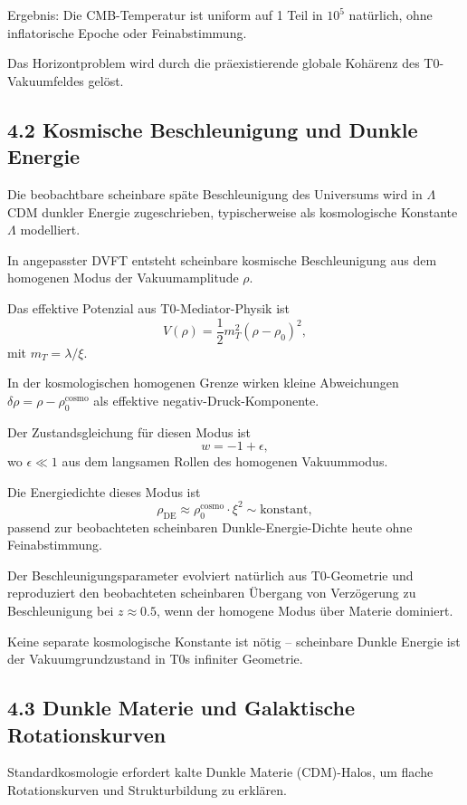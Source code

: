 	Ergebnis: Die CMB-Temperatur ist uniform auf 1 Teil in $10^5$ natürlich, ohne inflatorische Epoche oder Feinabstimmung.
	
	Das Horizontproblem wird durch die präexistierende globale Kohärenz des T0-Vakuumfeldes gelöst.
	
	\subsection{4.2 Kosmische Beschleunigung und Dunkle Energie}
	
	Die beobachtbare scheinbare späte Beschleunigung des Universums wird in $\Lambda$CDM dunkler Energie zugeschrieben, typischerweise als kosmologische Konstante $\Lambda$ modelliert.
	
	In angepasster DVFT entsteht scheinbare kosmische Beschleunigung aus dem homogenen Modus der Vakuumamplitude $\rho$.
	
	Das effektive Potenzial aus T0-Mediator-Physik ist
	\[
	V(\rho) = \frac{1}{2} m_T^2 (\rho - \rho_0)^2,
	\]
	mit $m_T = \lambda / \xi$.
	
	In der kosmologischen homogenen Grenze wirken kleine Abweichungen $\delta \rho = \rho - \rho_0^{\text{cosmo}}$ als effektive negativ-Druck-Komponente.
	
	Der Zustandsgleichung für diesen Modus ist
	\[
	w = -1 + \epsilon,
	\]
	wo $\epsilon \ll 1$ aus dem langsamen Rollen des homogenen Vakuummodus.
	
	Die Energiedichte dieses Modus ist
	\[
	\rho_{\text{DE}} \approx \rho_0^{\text{cosmo}} \cdot \xi^2 \sim \text{konstant},
	\]
	passend zur beobachteten scheinbaren Dunkle-Energie-Dichte heute ohne Feinabstimmung.
	
	Der Beschleunigungsparameter evolviert natürlich aus T0-Geometrie und reproduziert den beobachteten scheinbaren Übergang von Verzögerung zu Beschleunigung bei $z \approx 0.5$, wenn der homogene Modus über Materie dominiert.
	
	Keine separate kosmologische Konstante ist nötig – scheinbare Dunkle Energie ist der Vakuumgrundzustand in T0s infiniter Geometrie.
	
	\subsection{4.3 Dunkle Materie und Galaktische Rotationskurven}
	
	Standardkosmologie erfordert kalte Dunkle Materie (CDM)-Halos, um flache Rotationskurven und Strukturbildung zu erklären.
	
